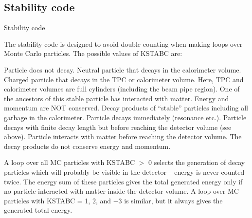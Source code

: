 \subsection{\label{sec-TVASC}Stability code}
\par
\begin{indentlist}{ 3.00cm}{ 3.25cm}
Stability code
\end{indentlist}
The stability code is designed to avoid double counting when making
loops over Monte Carlo particles. The possible values of KSTABC are:
\begin{indentlist}{ 1.25cm}{ 1.50cm}
Particle does not decay.
Neutral particle that decays in the calorimeter volume.
Charged particle that decays in the TPC or calorimeter volume. Here,
TPC and calorimeter volumes are full cylinders (including the beam
pipe region).
One of the ancestors of this stable particle has
interacted with matter. Energy and momentum are NOT conserved.
Decay products of ``stable'' particles including all
garbage in the calorimeter.
Particle decays immediately (resonance etc.).
Particle decays with finite decay length but before
reaching
the detector volume (see above).
Particle interacts with matter before reaching
the detector volume.
The decay products do not conserve energy and momentum.
\end{indentlist}
 
A loop over all MC particles with  KSTABC $>$ 0
selects the generation of decay
particles which
will probably be visible in the detector -- energy is never counted
twice.
The energy sum of these particles gives the total generated
energy only if
no particle interacted with
matter inside the detector volume.
A loop over MC particles with KSTABC = 1, 2, and $-$3
is similar, but it always gives the generated total energy.
\par
 
